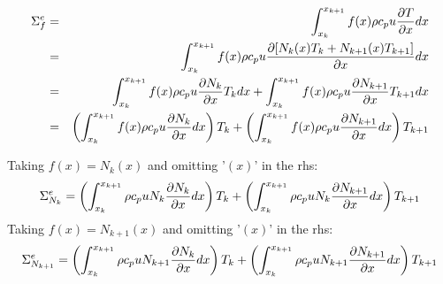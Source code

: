 \begin{eqnarray}
{\Sigma}_f^e 
&=&\int_{x_k}^{x_{k+1}} f(x) \rho c_p u\frac{\partial T}{\partial x} dx \nonumber\\
&=&\int_{x_k}^{x_{k+1}} f(x) \rho c_p u\frac{\partial [ N_{k}(x) {T}_k + N_{k+1}(x) {T}_{k+1} ] }{\partial x} dx \nonumber\\
&=&\int_{x_k}^{x_{k+1}} f(x) \rho c_p u\frac{\partial  N_{k} }{\partial x} T_k dx 
+  \int_{x_k}^{x_{k+1}} f(x) \rho c_p u\frac{\partial  N_{k+1} }{\partial x} T_{k+1} dx \nonumber\\
&=& \left(  \int_{x_k}^{x_{k+1}} f(x) \rho c_p u\frac{\partial  N_{k} }{\partial x} dx \right) T_k 
+ \left( \int_{x_k}^{x_{k+1}} f(x) \rho c_p u\frac{\partial  N_{k+1} }{\partial x} dx \right)T_{k+1}  \nonumber
\end{eqnarray}

Taking $f(x)=N_k(x)$ and omitting '$(x)$' in the rhs:
\[
{\Sigma}_{N_k}^e=
\left( \int_{x_k}^{x_{k+1}} \rho c_p u N_k \frac{\partial  N_{k} }{\partial x} dx \right) T_k 
+ 
\left( \int_{x_k}^{x_{k+1}} \rho c_p u N_k \frac{\partial  N_{k+1} }{\partial x} dx \right)T_{k+1}  \nonumber
\]
Taking $f(x)=N_{k+1}(x)$ and omitting '$(x)$' in the rhs:
\[
{\Sigma}_{N_{k+1}}^e=
\left( \int_{x_k}^{x_{k+1}} \rho c_p u N_{k+1} \frac{\partial  N_{k} }{\partial x} dx \right) T_k + 
\left( \int_{x_k}^{x_{k+1}} \rho c_p u N_{k+1} \frac{\partial  N_{k+1} }{\partial x} dx \right)T_{k+1}  \nonumber
\]



